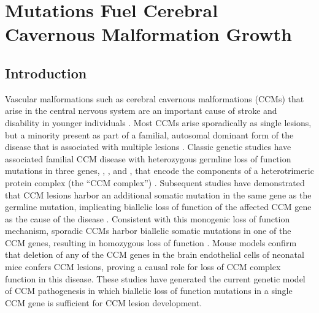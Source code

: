 \chapter{ Mutations Fuel Cerebral Cavernous Malformation Growth}
\label{chap:pik3ca}

\clearpage

\section{Introduction}
Vascular malformations such as cerebral cavernous malformations (CCMs) that arise in the central nervous system are an important cause of stroke and disability in younger individuals \citep{heiskanen1993, fischer2013}.  Most CCMs arise sporadically as single lesions, but a minority present as part of a familial, autosomal dominant form of the disease that is associated with multiple lesions \citep{cavalcanti2012}. Classic genetic studies have associated familial CCM disease with heterozygous germline loss of function mutations in three genes, , , and , that encode the components of a heterotrimeric protein complex (the “CCM complex”) \citep{fisher2014, plummer2005}. Subsequent studies have demonstrated that CCM lesions harbor an additional somatic mutation in the same gene as the germline mutation, implicating biallelic loss of function of the affected CCM gene as the cause of the disease \citep{gault2005, akers2009}. Consistent with this monogenic loss of function mechanism, sporadic CCMs harbor biallelic somatic mutations in one of the CCM genes, resulting in homozygous loss of function \citep{mcdonald2014}. Mouse models confirm that deletion of any of the CCM genes in the brain endothelial cells of neonatal mice confers CCM lesions, proving a causal role for loss of CCM complex function in this disease.  These studies have generated the current genetic model of CCM pathogenesis in which biallelic loss of function mutations in a single CCM gene is sufficient for CCM lesion development. 


